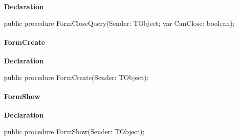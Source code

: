 \documentclass{report}
\newif\ifpdf
\begin{document}
\label{dgunit.TDGForm-FormCloseQuery}
\begin{list}{}{
\setlength{\itemindent}{0cm}
\setlength{\listparindent}{0cm}
\setlength{\leftmargin}{\evensidemargin}
\addtolength{\leftmargin}{\tmplength}
\settowidth{\labelsep}{X}
\addtolength{\leftmargin}{\labelsep}
\setlength{\labelwidth}{\tmplength}
}
\item[\textbf{Declaration}\hfill]
\ifpdf
\begin{flushleft}
\fi
\begin{ttfamily}
public procedure FormCloseQuery(Sender: TObject; var CanClose: boolean);\end{ttfamily}

\ifpdf
\end{flushleft}
\fi

\end{list}
\paragraph*{FormCreate}\hspace*{\fill}

\label{dgunit.TDGForm-FormCreate}
\begin{list}{}{
\setlength{\itemindent}{0cm}
\setlength{\listparindent}{0cm}
\setlength{\leftmargin}{\evensidemargin}
\addtolength{\leftmargin}{\tmplength}
\settowidth{\labelsep}{X}
\addtolength{\leftmargin}{\labelsep}
\setlength{\labelwidth}{\tmplength}
}
\item[\textbf{Declaration}\hfill]
\ifpdf
\begin{flushleft}
\fi
\begin{ttfamily}
public procedure FormCreate(Sender: TObject);\end{ttfamily}

\ifpdf
\end{flushleft}
\fi

\end{list}
\paragraph*{FormShow}\hspace*{\fill}

\label{dgunit.TDGForm-FormShow}
\begin{list}{}{
\setlength{\itemindent}{0cm}
\setlength{\listparindent}{0cm}
\setlength{\leftmargin}{\evensidemargin}
\addtolength{\leftmargin}{\tmplength}
\settowidth{\labelsep}{X}
\addtolength{\leftmargin}{\labelsep}
\setlength{\labelwidth}{\tmplength}
}
\item[\textbf{Declaration}\hfill]
\ifpdf
\begin{flushleft}
\fi
\begin{ttfamily}
public procedure FormShow(Sender: TObject);\end{ttfamily}

\ifpdf
\end{flushleft}
\fi

\end{list}
\end{document}
